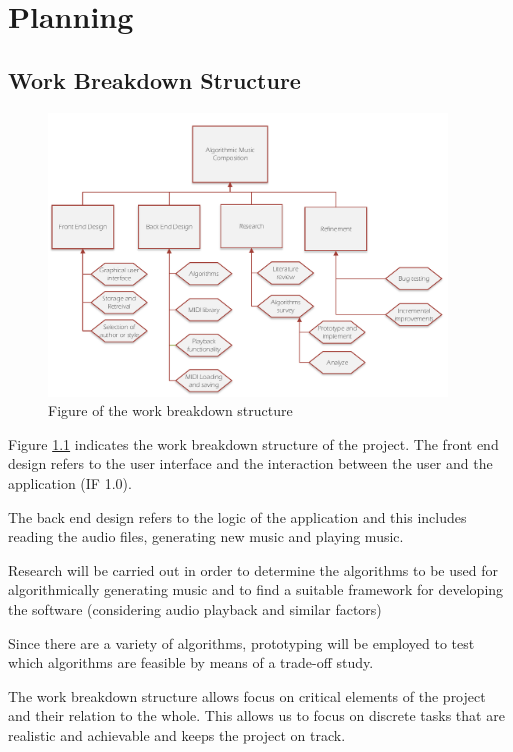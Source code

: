 \chapter{Planning}



\section{Work Breakdown Structure}
\begin{figure}
\centerline{\includegraphics[width=400px]{../images/wbs.pdf}}
\caption{Figure of the work breakdown structure}
\label{ims:sdp}
\end{figure}

Figure \ref{ims:sdp} indicates the work breakdown structure of the project. 
The front end design refers to the user interface and the interaction between the user and the application (IF 1.0).

The back end design refers to the logic of the application and this includes reading the audio files, generating new music and playing music.

Research will be carried out in order to determine the algorithms to be used for algorithmically generating music and to find a suitable framework for developing the software (considering audio playback and similar factors)

Since there are a variety of algorithms, prototyping will be employed to test which algorithms are feasible by means of a trade-off study.

The work breakdown structure allows focus on critical elements of the project and their relation to the whole. This allows us to focus on discrete tasks that are realistic and achievable and keeps the project on track.



